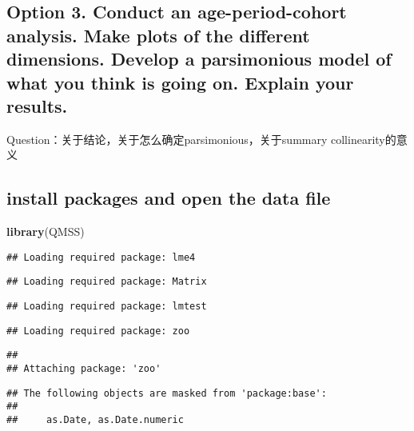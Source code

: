\documentclass[]{article}
\title{}
\author{}
\date{}
\newenvironment{Shaded}{\begin{snugshade}}{\end{snugshade}}
\newcommand{\KeywordTok}[1]{\textcolor[rgb]{0.13,0.29,0.53}{\textbf{#1}}}
\newcommand{\NormalTok}[1]{#1}
\begin{document}
\hypertarget{option-3.-conduct-an-age-period-cohort-analysis.-make-plots-of-the-different-dimensions.-develop-a-parsimonious-model-of-what-you-think-is-going-on.-explain-your-results.}{%
\subsection{Option 3. Conduct an age-period-cohort analysis. Make plots
of the different dimensions. Develop a parsimonious model of what you
think is going on. Explain your
results.}\label{option-3.-conduct-an-age-period-cohort-analysis.-make-plots-of-the-different-dimensions.-develop-a-parsimonious-model-of-what-you-think-is-going-on.-explain-your-results.}}

Question：关于结论，关于怎么确定parsimonious，关于summary
collinearity的意义

\hypertarget{install-packages-and-open-the-data-file}{%
\subsection{install packages and open the data
file}\label{install-packages-and-open-the-data-file}}

\begin{Shaded}
\begin{Highlighting}[]
\KeywordTok{library}\NormalTok{(QMSS)}
\end{Highlighting}
\end{Shaded}

\begin{verbatim}
## Loading required package: lme4
\end{verbatim}

\begin{verbatim}
## Loading required package: Matrix
\end{verbatim}

\begin{verbatim}
## Loading required package: lmtest
\end{verbatim}

\begin{verbatim}
## Loading required package: zoo
\end{verbatim}

\begin{verbatim}
## 
## Attaching package: 'zoo'
\end{verbatim}

\begin{verbatim}
## The following objects are masked from 'package:base':
## 
##     as.Date, as.Date.numeric
\end{verbatim}
\end{document}
